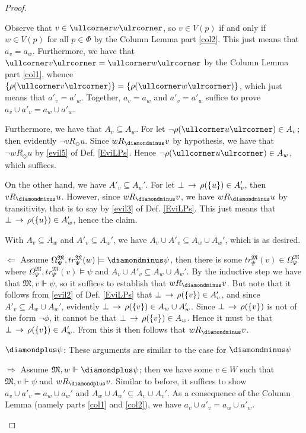 \documentclass[11pt]{article}
\newcommand{\DD}{\diamondminus}
\newcommand{\DDI}{\diamondplus}
\newcommand{\Pos}{\Diamond}
\newcommand{\lc}{\ullcorner}
\newcommand{\rc}{\ulrcorner}
\begin{document}
\begin{proof}
\begin{peano}
\begin{peano}
	Observe that $v \in \lc w \rc$, so $v \in V(p)$ if and only if $w \in V(p)$ for all $p \in \Phi$ by the Column Lemma part \ref{col2}.  This just means that $a_v = a_w$.  Furthermore, we have that $\lc v \rc = \lc w \rc$ by the Column Lemma part \ref{col1}, whence $\{ \rho(\lc v \rc) \} = \{ \rho(\lc w \rc) \}$, which just means that $a'_v = a'_w$.  Together, $a_v = a_w$ and $a'_v = a'_w$ suffice to prove $a_v \cup a'_v = a_w \cup a'_w$.
	
	Furthermore, we have that $A_v \subseteq A_w$.  For let $\neg \rho(\lc u\rc) \in  A_v$; then evidently $\neg v R_\Pos u$.  Since $w R_\DD v$ by hypothesis, we have that $\neg w R_\Pos u$ by \ref{evil5} of Def. \ref{EviLPs}.  Hence $\neg \rho(\lc u\rc) \in A_w$, which suffices.
	
	On the other hand, we have $A'_v \subseteq A_w'$. For let $\bot \,\rightarrow\, \rho(\{ u \}) \in A'_v$, then $v R_\DD u$.  However, since $w R_\DD v$, we have $w R_\DD u$ by transitivity, that is to say by \ref{evil3} of Def. \ref{EviLPs}.  This just means that $\bot \,\rightarrow\, \rho(\{ u \}) \in A'_w$, hence the claim.
	
	With $A_v \subseteq A_w$ and $A'_v \subseteq A_w'$, we have $A_v \cup A'_v \subseteq A_w \cup A_w'$, which is as desired.
	
	\item $\Leftarrow$  Assume $\Omega_{\Psi}^\mathfrak{M}, tr_{\Psi}^\mathfrak{M}(w) \models \DD\psi$, then there is some $tr_{\Psi}^\mathfrak{M}(v) \in \Omega_{\Psi}^\mathfrak{M}$ where $\Omega_{\Psi}^\mathfrak{M}, tr_{\Psi}^\mathfrak{M}(v) \models \psi$ and $A_v \cup A'_v \subseteq A_w \cup A_w'$.  By the inductive step we have that $\mathfrak{M},v \Vdash \psi$, so it suffices to establish that $w R_\DD v$.  But note that it follows from \ref{evil2} of Def. \ref{EviLPs} that $\bot \,\rightarrow\, \rho(\{v\}) \in A'_v$, and since $A'_v \subseteq A_w \cup A_w'$, evidently $\bot \,\rightarrow\, \rho(\{v\}) \in A_w \cup A_w'$.  Since $\bot \,\rightarrow\, \rho(\{v\})$ is not of the form $\neg \phi$, it cannot be that $\bot \,\rightarrow\, \rho(\{v\})\in A_w$.  Hence it must be that $\bot \,\rightarrow\, \rho(\{v\}) \in A'_w$.  From this it then follows that $w R_\DD v$.
 \end{peano}
 \item $\DDI \psi$: These arguments are similar to the case for $\DD \psi$
 \begin{peano}
 	\item $\Rightarrow$ Assume $\mathfrak{M},w \Vdash \DDI \psi$; then we have some $v \in W$ such that $\mathfrak{M},v \Vdash \psi$ and $w R_\DDI v$.  Similar to before, it suffices to show $a_v \cup a'_v = a_w \cup a_w'$ and $A_w \cup A_w' \subseteq A_v \cup A_v'$.  As a consequence of the Column Lemma (namely parts \ref{col1} and \ref{col2}), we have $a_v \cup a'_v = a_w \cup a'_w$.
	

\end{peano}
\end{peano}
\end{proof}
\end{document}

